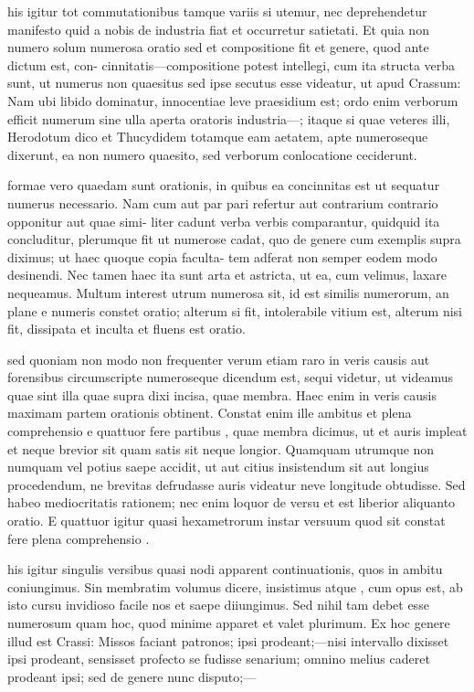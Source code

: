  his igitur tot commutationibus tamque variis si utemur, nec deprehendetur manifesto quid a nobis de industria fiat et occurretur satietati. Et quia non numero solum numerosa oratio sed et compositione fit et genere, quod ante dictum est, con- cinnitatis—compositione potest intellegi, cum ita structa verba sunt, ut numerus non quaesitus sed ipse secutus esse videatur, ut apud Crassum: Nam ubi libido dominatur, innocentiae leve praesidium est; ordo enim verborum efficit numerum sine ulla aperta oratoris industria—; itaque si quae veteres illi, Herodotum dico et Thucydidem totamque eam aetatem, apte numeroseque dixerunt, ea non numero quaesito, sed verborum conlocatione ceciderunt.

 formae vero quaedam sunt orationis, in quibus ea concinnitas est ut sequatur numerus necessario. Nam cum aut par pari refertur aut contrarium contrario opponitur aut quae simi- liter cadunt verba verbis comparantur, quidquid ita concluditur, plerumque fit ut numerose cadat, quo de genere cum exemplis supra diximus; ut haec quoque copia faculta- tem adferat non semper eodem modo desinendi. Nec tamen haec ita sunt arta et astricta, ut ea, cum velimus, laxare nequeamus. Multum interest utrum numerosa sit, id est similis numerorum, an plane e numeris constet oratio; alterum si fit, intolerabile vitium est, alterum nisi fit, dissipata et inculta et fluens est oratio.

 sed quoniam non modo non frequenter verum etiam raro in veris causis aut forensibus circumscripte numeroseque dicendum est, sequi videtur, ut videamus quae sint illa quae supra dixi incisa, quae membra. Haec enim in veris causis maximam partem orationis obtinent. Constat enim ille ambitus et plena comprehensio e quattuor fere partibus , quae membra dicimus, ut et auris impleat et neque brevior sit quam satis sit neque longior. Quamquam utrumque non numquam vel potius saepe accidit, ut aut citius insistendum sit aut longius procedendum, ne brevitas defrudasse auris videatur neve longitude obtudisse. Sed habeo mediocritatis rationem; nec enim loquor de versu et est liberior aliquanto oratio. E quattuor igitur quasi hexametrorum instar versuum quod sit constat fere plena comprehensio .

 his igitur singulis versibus quasi nodi apparent continuationis, quos in ambitu coniungimus. Sin membratim volumus dicere, insistimus atque , cum opus est, ab isto cursu invidioso facile nos et saepe diiungimus. Sed nihil tam debet esse numerosum quam hoc, quod minime apparet et valet plurimum. Ex hoc genere illud est Crassi: Missos faciant patronos; ipsi prodeant;—nisi intervallo dixisset ipsi prodeant, sensisset profecto se fudisse senarium; omnino melius caderet prodeant ipsi; sed de genere nunc disputo;—

